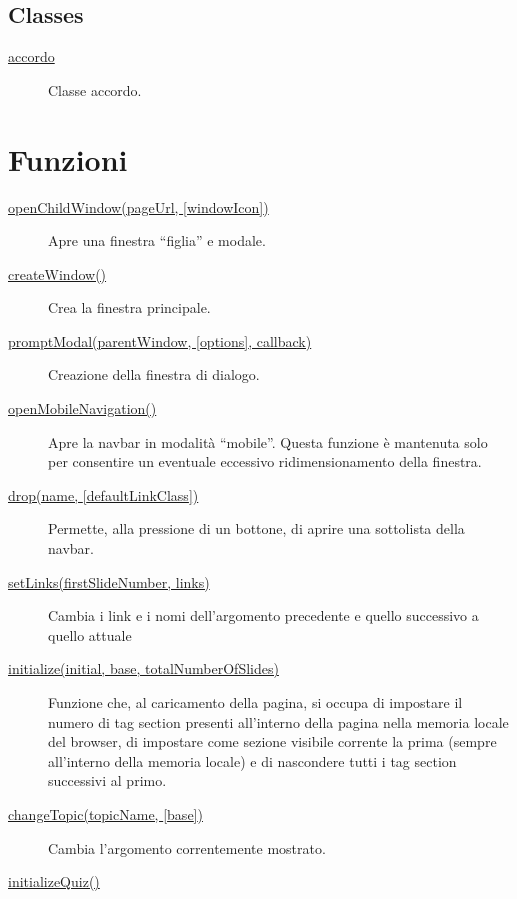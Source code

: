 \hypertarget{classes}{%
\subsection{Classes}\label{classes}}

\begin{description}
\item[{ \protect\hyperlink{accordo}{accordo} }]
Classe accordo.
\end{description}

\hypertarget{functions}{%
\section{Funzioni}\label{functions}}

\begin{description}
\item[{ \protect\hyperlink{openChildWindow}{openChildWindow(pageUrl,
{[}windowIcon{]})} }]
Apre una finestra ``figlia'' e modale.
\item[{ \protect\hyperlink{createWindow}{createWindow()} }]
Crea la finestra principale.
\item[{ \protect\hyperlink{promptModal}{promptModal(parentWindow,
{[}options{]}, callback)} }]
Creazione della finestra di dialogo.
\item[{ \protect\hyperlink{openMobileNavigation}{openMobileNavigation()}
}]
Apre la navbar in modalità ``mobile''. Questa funzione è mantenuta solo
per consentire un eventuale eccessivo ridimensionamento della finestra.
\item[{ \protect\hyperlink{drop}{drop(name, {[}defaultLinkClass{]})} }]
Permette, alla pressione di un bottone, di aprire una sottolista della
navbar.
\item[{ \protect\hyperlink{setLinks}{setLinks(firstSlideNumber, links)}
}]
Cambia i link e i nomi dell'argomento precedente e quello successivo a
quello attuale
\item[{ \protect\hyperlink{initialize}{initialize(initial, base,
totalNumberOfSlides)} }]
Funzione che, al caricamento della pagina, si occupa di impostare il
numero di tag section presenti all'interno della pagina nella memoria
locale del browser, di impostare come sezione visibile corrente la prima
(sempre all'interno della memoria locale) e di nascondere tutti i tag
section successivi al primo.
\item[{ \protect\hyperlink{changeTopic}{changeTopic(topicName,
{[}base{]})} }]
Cambia l'argomento correntemente mostrato.
\item[{ \protect\hyperlink{initializeQuiz}{initializeQuiz()} }]

\end{description}
